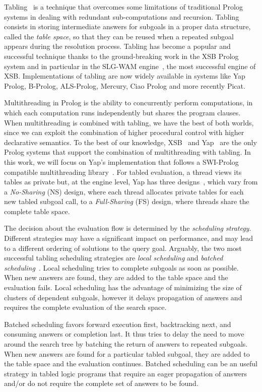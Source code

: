 \documentclass{llncs}
\begin{document}
Tabling~\cite{Chen-96} is a technique that overcomes some limitations
of traditional Prolog systems in dealing with redundant
sub-computations and recursion. Tabling consists in storing
intermediate answers for subgoals in a proper data structure, called
the \emph{table space}, so that they can be reused when a repeated
subgoal appears during the resolution process. Tabling has become a
popular and successful technique thanks to the ground-breaking work in
the XSB Prolog system and in particular in the SLG-WAM
engine~\cite{Sagonas-98}, the most successful engine of
XSB. Implementations of tabling are now widely available in systems
like Yap Prolog, B-Prolog, ALS-Prolog, Mercury, Ciao Prolog and more
recently Picat.

Multithreading in Prolog is the ability to concurrently perform
computations, in which each computation runs independently but shares
the program clauses. When multithreading is combined with tabling, we
have the best of both worlds, since we can exploit the combination of
higher procedural control with higher declarative semantics. To the
best of our knowledge, XSB~\cite{Marques-08} and Yap~\cite{Areias-12a}
are the only Prolog systems that support the combination of
multithreading with tabling. In this work, we will focus on Yap's
implementation that follows a SWI-Prolog compatible multithreading
library~\cite{Wielemaker-03}. For tabled evaluation, a thread views
its tables as private but, at the engine level, Yap has three
designs~\cite{Areias-12a}, which vary from a \emph{No-Sharing} (NS)
design, where each thread allocates private tables for each new tabled
subgoal call, to a \emph{Full-Sharing} (FS) design, where threads
share the complete table space.

The decision about the evaluation flow is determined by the
\emph{scheduling strategy}. Different strategies may have a
significant impact on performance, and may lead to a different
ordering of solutions to the query goal. Arguably, the two most
successful tabling scheduling strategies are \emph{local scheduling}
and \emph{batched scheduling}~\cite{Freire-96}. Local scheduling tries
to complete subgoals as soon as possible. When new answers are found,
they are added to the table space and the evaluation fails. Local
scheduling has the advantage of minimizing the size of clusters of
dependent subgoals, however it delays propagation of answers and
requires the complete evaluation of the search space. 

Batched scheduling favors forward execution first, backtracking next,
and consuming answers or completion last. It thus tries to delay the
need to move around the search tree by batching the return of answers
to repeated subgoals. When new answers are found for a particular
tabled subgoal, they are added to the table space and the evaluation
continues. Batched scheduling can be an useful strategy in tabled
logic programs that require an eager propagation of answers and/or do
not require the complete set of answers to be found.
\end{document}
